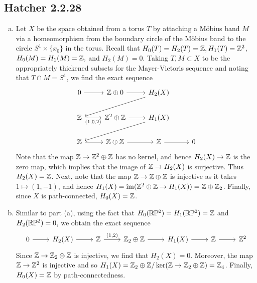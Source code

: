 \documentclass{../mathnotes}
\begin{document}
\subsection*{Hatcher 2.2.28}
\begin{enumerate}[(a)]
    \item Let $X$ be the space obtained from a torus $T$ by attaching a M\"obius band $M$
        via a homeomorphism from the boundary circle of the M\"obius band to the circle $S^1\times \{x_0\}$
        in the torus. Recall that $H_0(T)=H_2(T)=\mathbb{Z}, H_1(T)=\mathbb{Z}^2$, $H_0(M)=H_1(M)=\mathbb{Z},$ and $H_2(M)=0$.
        Taking $T,M\subset X$ to be the appropriately thickened subsets for the Mayer-Vietoris sequence and noting
        that $T\cap M=S^1$, we find the exact sequence
        \begin{equation*}
            \begin{tikzcd}
                0\ar{r} & \Z\oplus 0\ar{r} & H_2(X)\ar{lld}\\
                \Z\ar[swap]{r}{(1,0,2)} & \Z^2\oplus \Z\ar{r} & H_1(X)\ar{lld}\\
                \Z\ar{r} & \Z\oplus\Z\ar{r} & \Z\ar{r} & 0
            \end{tikzcd}
        \end{equation*}
        Note that the map $\mathbb{Z}\to\mathbb{Z}^2\oplus\mathbb{Z}$ has no kernel, and hence $H_2(X)\to\mathbb{Z}$ is the zero map, which
        implies that the image of $\mathbb{Z}\to H_2(X)$ is surjective. Thus $H_2(X)=\mathbb{Z}$. Next, note that the map
        $\mathbb{Z}\to\mathbb{Z}\oplus\mathbb{Z}$ is injective as it takes $1\mapsto (1,-1)$, and hence $H_1(X)=\operatorname{im}(\mathbb{Z}^2\oplus\mathbb{Z}\to H_1(X))
        =\mathbb{Z}\oplus\mathbb{Z}_2$. Finally, since $X$ is path-connected, $H_0(X)=\mathbb{Z}$.
    \item Similar to part (a), using the fact that $H_0(\mathbb{R}\mathbb{P}^2)=H_1(\mathbb{R}\mathbb{P}^2)=\mathbb{Z}$ and $H_2(\mathbb{R}\mathbb{P}^2)=0$, we obtain
        the exact sequence
        \begin{equation*}
            \begin{tikzcd}
                0\ar{r} & H_2(X)\ar{r} & \Z\ar{r}{(1,2)} & \Z_2\oplus \Z\ar{r} & H_1(X)\ar{r} & \Z\ar{r} & \Z^2
            \end{tikzcd}
        \end{equation*}
        Since $\mathbb{Z}\to\mathbb{Z}_2\oplus\mathbb{Z}$ is injective, we find that $H_2(X)=0$. Moreover, the map
        $\mathbb{Z}\to\mathbb{Z}^2$ is injective and so $H_1(X)=\mathbb{Z}_2\oplus\mathbb{Z}/\ker(\mathbb{Z}\to\mathbb{Z}_2\oplus\mathbb{Z})=\mathbb{Z}_4$.
        Finally, $H_0(X)=\mathbb{Z}$ by path-connectedness.
\end{enumerate}
\end{document}
